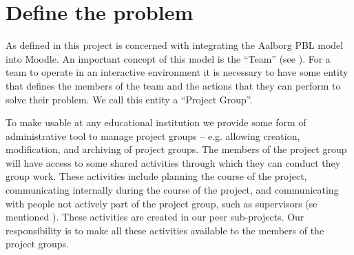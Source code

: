 \chapter{Define the problem}
\label{chap:introProjectgroup}


As defined in  this project is concerned with integrating the Aalborg PBL model into Moodle.
An important concept of this model is the ``Team'' (see ).
For a team to operate in an interactive environment it is necessary to have some entity that defines the members of the team and the actions that they can perform to solve their problem.
We call this entity a ``Project Group''.

To make \system{} usable at any educational institution we provide some form of administrative tool to manage project groups -- e.g. allowing  creation, modification, and archiving of project groups.
The members of the project group will have access to some shared activities through which they can conduct they group work.
These activities include planning the course of the project, communicating internally during the course of the project, and communicating with people not actively part of the project group, such as supervisors (se mentioned ).
These activities are created in our peer sub-projects.
Our responsibility is to make all these activities available to the members of the project groups.
	